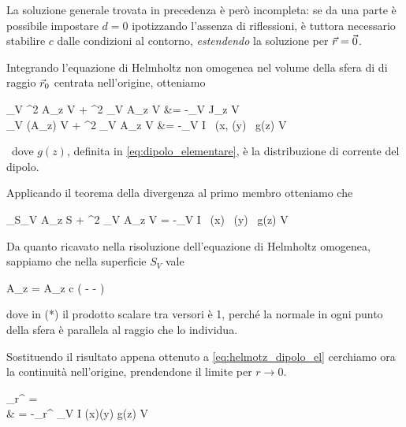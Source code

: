 \smallbreak
La soluzione generale trovata in precedenza è però incompleta: se da una parte è possibile impostare $d = 0$ ipotizzando l'assenza di riflessioni, è tuttora necessario stabilire $c$ dalle condizioni al contorno, \emph{estendendo} la soluzione per $\vec{r} = \vec{0}$.

Integrando l'equazione di Helmholtz non omogenea nel volume della sfera di di raggio $\vec{r}_0$ centrata nell'origine, otteniamo
\begin{esp*}
	\int_V \nabla^2 A_z \de V + \omega^2 \mu \epsilon \int_V A_z \de V &= -\mu \int_V J_z \de V \\
	\int_V \diverg(\nabla A_z) \de V + \omega^2 \mu \epsilon \int_V A_z \de V &= -\mu \int_V I \, \delta(x, \delta(y) \, g(z) \de V
\end{esp*} \,
dove $g(z)$, definita in \autoref{eq:dipolo_elementare}, è la distribuzione di corrente del dipolo.

Applicando il teorema della divergenza al primo membro otteniamo che
\begin{esp} \label{eq:helmotz_dipolo_el}
	\int_{S_V} \nabla A_z  \de S
	+ \omega^2 \mu \epsilon \int_V A_z \de V
	= -\mu \int_V I \, \delta(x) \, \delta(y) \, g(z) \de V \\
\end{esp}

Da quanto ricavato nella risoluzione dell'equazione di Helmholtz omogenea, sappiamo che nella superficie $S_V$ vale
\begin{esp*}
	\nabla A_z \cdot {}
	=  A_z  \cdot {}
	\stackrel{(*)}{=} c \left(
			-\jmath \beta {}
			- 
		\right)
\end{esp*}
dove in (*) il prodotto scalare tra versori è 1, perché la normale in ogni punto della sfera è parallela al raggio che lo individua.

Sostituendo il risultato appena ottenuto a \autoref{eq:helmotz_dipolo_el} cerchiamo ora la continuità nell'origine, prendendone il limite per $r \to 0$.

\begin{esp*}
	\lim_{r^\prime {}}  = \\
	& = -\mu \lim_{r^\prime {}} \int_V I \delta(x)\delta(y) g(z) \de V \\
\end{esp*}

